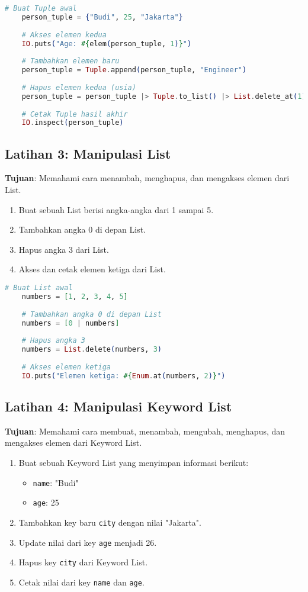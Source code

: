\begin{lstlisting}[language=Elixir]
	# Buat Tuple awal
	person_tuple = {"Budi", 25, "Jakarta"}
	
	# Akses elemen kedua
	IO.puts("Age: #{elem(person_tuple, 1)}")
	
	# Tambahkan elemen baru
	person_tuple = Tuple.append(person_tuple, "Engineer")
	
	# Hapus elemen kedua (usia)
	person_tuple = person_tuple |> Tuple.to_list() |> List.delete_at(1) |> List.to_tuple()
	
	# Cetak Tuple hasil akhir
	IO.inspect(person_tuple)
\end{lstlisting}

\subsection{Latihan 3: Manipulasi List}
\textbf{Tujuan}: Memahami cara menambah, menghapus, dan mengakses elemen dari List.

\begin{enumerate}
	\item Buat sebuah List berisi angka-angka dari 1 sampai 5.
	\item Tambahkan angka 0 di depan List.
	\item Hapus angka 3 dari List.
	\item Akses dan cetak elemen ketiga dari List.
\end{enumerate}

\begin{lstlisting}[language=Elixir]
	# Buat List awal
	numbers = [1, 2, 3, 4, 5]
	
	# Tambahkan angka 0 di depan List
	numbers = [0 | numbers]
	
	# Hapus angka 3
	numbers = List.delete(numbers, 3)
	
	# Akses elemen ketiga
	IO.puts("Elemen ketiga: #{Enum.at(numbers, 2)}")
\end{lstlisting}

\subsection{Latihan 4: Manipulasi Keyword List}
\textbf{Tujuan}: Memahami cara membuat, menambah, mengubah, menghapus, dan mengakses elemen dari Keyword List.

\begin{enumerate}
	\item Buat sebuah Keyword List yang menyimpan informasi berikut:
	\begin{itemize}
		\item \texttt{name}: "Budi"
		\item \texttt{age}: 25
	\end{itemize}
	\item Tambahkan key baru \texttt{city} dengan nilai "Jakarta".
	\item Update nilai dari key \texttt{age} menjadi 26.
	\item Hapus key \texttt{city} dari Keyword List.
	\item Cetak nilai dari key \texttt{name} dan \texttt{age}.
\end{enumerate}

